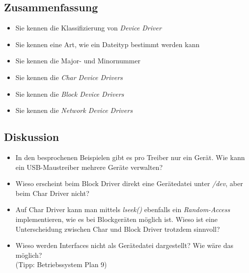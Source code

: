 \subsection{Zusammenfassung}

\begin{itemize}
   \item Sie kennen die Klassifizierung von \emph{Device Driver}
   \item Sie kennen eine Art, wie ein Dateityp bestimmt werden kann
   \item Sie kennen die Major- und Minornummer
   \item Sie kennen die \emph{Char Device Drivers}
   \item Sie kennen die \emph{Block Device Drivers}
   \item Sie kennen die \emph{Network Device Drivers}
\end{itemize}


\subsection{Diskussion}

\begin{itemize}
   \item In den besprochenen Beispielen gibt es pro Treiber nur ein Gerät. Wie kann ein USB-Maustreiber mehrere
         Geräte verwalten?
   \item Wieso erscheint beim Block Driver direkt eine Gerätedatei unter \emph{/dev}, aber beim Char Driver nicht?
   \item Auf Char Driver kann man mittels \emph{lseek()} ebenfalls ein \emph{Random-Access} implementieren, wie es bei
         Blockgeräten möglich ist. Wieso ist eine Unterscheidung zwischen Char und Block Driver trotzdem sinnvoll?
   \item Wieso werden Interfaces nicht als Gerätedatei dargestellt? Wie wäre das möglich? \\ (Tipp: Betriebssystem Plan 9)
\end{itemize}

